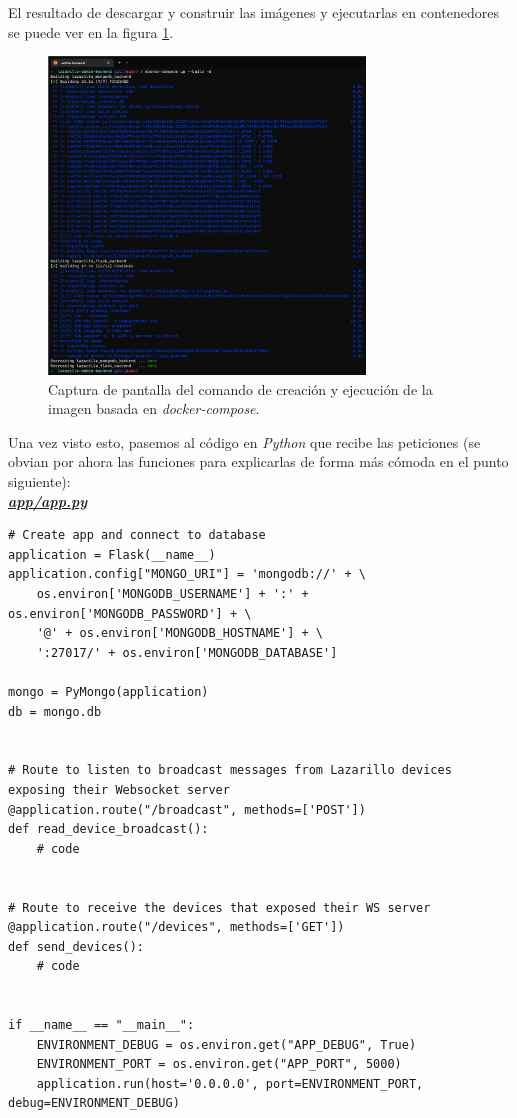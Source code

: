 El resultado de descargar y construir las imágenes y ejecutarlas en contenedores se puede ver en la figura \ref{docker-compose-build}.\\

\begin{figure}[h]
	\centering
	\includegraphics[width=0.75\textwidth]{imagenes/docker-compose-build.png}
	\caption{Captura de pantalla del comando de creación y ejecución de la imagen basada en \textit{docker-compose}.}
	\label{docker-compose-build}
\end{figure}

Una vez visto esto, pasemos al código en \textit{Python} que recibe las peticiones (se obvian por ahora las funciones para explicarlas de forma más cómoda en el punto siguiente):\\

\textbf{\textit{\href{https://github.com/adrianmorente/lazarillo-admin-backend/blob/main/app/app.py}{app/app.py}}}
\begin{lstlisting}
# Create app and connect to database
application = Flask(__name__)
application.config["MONGO_URI"] = 'mongodb://' + \
	os.environ['MONGODB_USERNAME'] + ':' + os.environ['MONGODB_PASSWORD'] + \
	'@' + os.environ['MONGODB_HOSTNAME'] + \
	':27017/' + os.environ['MONGODB_DATABASE']

mongo = PyMongo(application)
db = mongo.db


# Route to listen to broadcast messages from Lazarillo devices exposing their Websocket server
@application.route("/broadcast", methods=['POST'])
def read_device_broadcast():
	# code


# Route to receive the devices that exposed their WS server
@application.route("/devices", methods=['GET'])
def send_devices():
	# code


if __name__ == "__main__":
	ENVIRONMENT_DEBUG = os.environ.get("APP_DEBUG", True)
	ENVIRONMENT_PORT = os.environ.get("APP_PORT", 5000)
	application.run(host='0.0.0.0', port=ENVIRONMENT_PORT, debug=ENVIRONMENT_DEBUG)
\end{lstlisting}


